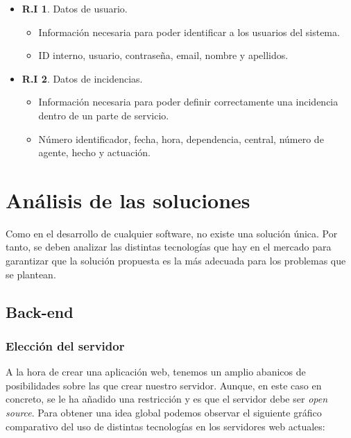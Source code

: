 \begin{itemize}
	\item \textbf{R.I 1}. Datos de usuario.
	\begin{itemize}
		\item Información necesaria para poder identificar a los usuarios del sistema.
		\item ID interno, usuario, contraseña, email, nombre y apellidos.
	\end{itemize}

	\item \textbf{R.I 2}. Datos de incidencias.
	\begin{itemize}
		\item Información necesaria para poder definir correctamente una incidencia dentro de un parte de servicio.
		\item Número identificador, fecha, hora, dependencia, central, número de agente, hecho y actuación.
	\end{itemize}
\end{itemize}

\section{Análisis de las soluciones}

Como en el desarrollo de cualquier software, no existe una solución única. Por tanto, se deben analizar las
distintas tecnologías que hay en el mercado para garantizar que la solución propuesta es la más adecuada para
los problemas que se plantean.\\

\subsection{Back-end}

\subsubsection{Elección del servidor} 
A la hora de crear una aplicación web, tenemos un amplio abanicos de posibilidades sobre las que crear nuestro servidor. Aunque, en este caso
en concreto, se le ha añadido una restricción y es que el servidor debe ser \textit{open source}. Para obtener
una idea global podemos observar el siguiente gráfico comparativo del uso de distintas tecnologías en los servidores web actuales:

